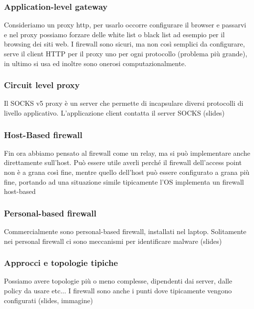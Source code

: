 \documentclass[12pt, oneside]{extbook} %
\begin{document}
\subsubsection{Application-level gateway}
Consideriamo un proxy http, per usarlo occorre configurare il browser e passarvi e nel proxy possiamo forzare delle white list o black list ad esempio per il browsing dei siti web. I firewall sono sicuri, ma non così semplici da configurare, serve il client HTTP per il proxy uno per ogni protocollo (problema più grande), in ultimo si usa ed inoltre sono onerosi computazionalmente.
\subsubsection{Circuit level proxy}
Il SOCKS v5 proxy è un server che permette di incapsulare diversi protocolli di livello applicativo. L'applicazione client contatta il server SOCKS (slides)
\subsubsection{Host-Based firewall}
Fin ora abbiamo pensato al firewall come un relay, ma si può implementare anche direttamente sull'host. Può essere utile averli perché il firewall dell'access point non è a grana così fine, mentre quello dell'host può essere configurato a grana più fine, portando ad una situazione simile
tipicamente l'OS implementa un firewall host-based
\subsubsection{Personal-based firewall}
Commercialmente sono personal-based firewall, installati nel laptop. Solitamente nei personal firewall ci sono meccanismi per identificare malware
(slides)
\subsubsection{Approcci e topologie tipiche}
Possiamo avere topologie più o meno complesse, dipendenti dai server, dalle policy da usare etc...
I firewall sono anche i punti dove tipicamente vengono configurati (slides, immagine)
\end{document}
